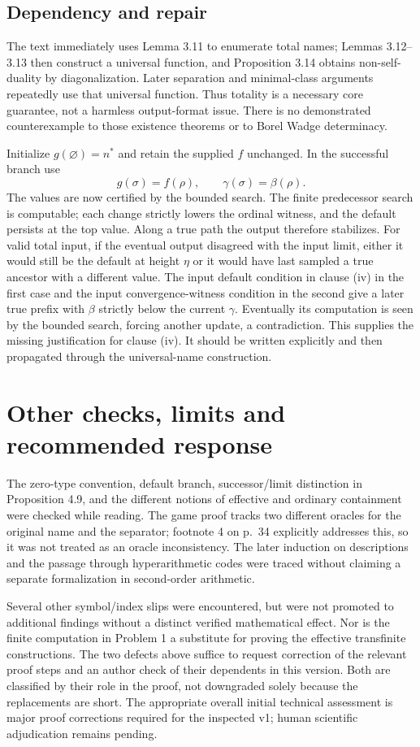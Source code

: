 \documentclass[10pt]{article}
\begin{document}
\subsection*{Dependency and repair}
The text immediately uses Lemma 3.11 to enumerate total names; Lemmas 3.12–3.13 then construct a universal function, and Proposition 3.14 obtains non-self-duality by diagonalization. Later separation and minimal-class arguments repeatedly use that universal function. Thus totality is a necessary core guarantee, not a harmless output-format issue. There is no demonstrated counterexample to those existence theorems or to Borel Wadge determinacy.\par
Initialize \(g(\varnothing)=n^*\) and retain the supplied \(f\) unchanged. In the successful branch use \[g(\sigma)=f(\rho),\qquad
                  \gamma(\sigma)=\beta(\rho).\] The values are now certified by the bounded search. The finite predecessor search is computable; each change strictly lowers the ordinal witness, and the default persists at the top value. Along a true path the output therefore stabilizes. For valid total input, if the eventual output disagreed with the input limit, either it would still be the default at height \(\eta\) or it would have last sampled a true ancestor with a different value. The input default condition in clause (iv) in the first case and the input convergence-witness condition in the second give a later true prefix with \(\beta\) strictly below the current \(\gamma\). Eventually its computation is seen by the bounded search, forcing another update, a contradiction. This supplies the missing justification for clause (iv). It should be written explicitly and then propagated through the universal-name construction.\par
\section*{Other checks, limits and recommended response}
The zero-type convention, default branch, successor/limit distinction in Proposition 4.9, and the different notions of effective and ordinary containment were checked while reading. The game proof tracks two different oracles for the original name and the separator; footnote 4 on p. 34 explicitly addresses this, so it was not treated as an oracle inconsistency. The later induction on descriptions and the passage through hyperarithmetic codes were traced without claiming a separate formalization in second-order arithmetic.\par
Several other symbol/index slips were encountered, but were not promoted to additional findings without a distinct verified mathematical effect. Nor is the finite computation in Problem 1 a substitute for proving the effective transfinite constructions. The two defects above suffice to request correction of the relevant proof steps and an author check of their dependents in this version. Both are classified by their role in the proof, not downgraded solely because the replacements are short. The appropriate overall initial technical assessment is major proof corrections required for the inspected v1; human scientific adjudication remains pending.\par
\end{document}
